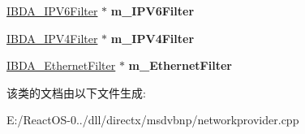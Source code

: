 \begin{DoxyCompactItemize}
\hyperlink{interface_i_b_d_a___i_p_v6_filter}{I\+B\+D\+A\+\_\+\+I\+P\+V6\+Filter} $\ast$ {\bfseries m\+\_\+\+I\+P\+V6\+Filter}
\item 
\mbox{\label{class_c_network_provider_a6c28ee3b20fc0a752ad24b892b20d60e}} 
\hyperlink{interface_i_b_d_a___i_p_v4_filter}{I\+B\+D\+A\+\_\+\+I\+P\+V4\+Filter} $\ast$ {\bfseries m\+\_\+\+I\+P\+V4\+Filter}
\item 
\mbox{\label{class_c_network_provider_a26b2342ae42e8eb5672fccade67470fd}} 
\hyperlink{interface_i_b_d_a___ethernet_filter}{I\+B\+D\+A\+\_\+\+Ethernet\+Filter} $\ast$ {\bfseries m\+\_\+\+Ethernet\+Filter}
\end{DoxyCompactItemize}


该类的文档由以下文件生成\+:\begin{DoxyCompactItemize}
\item 
E\+:/\+React\+O\+S-\/0../dll/directx/msdvbnp/networkprovider.\+cpp\end{DoxyCompactItemize}

